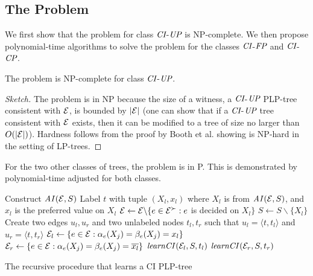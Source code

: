 \vspace{-0.1cm}
\subsection{The  Problem}

\vspace{-0.1cm}
We first show that the  problem for class $\textit{CI}$-$\textit{UP}$ is 
NP-complete. We then propose polynomial-time algorithms to solve the 
 problem
for the classes $\textit{CI}$-$\textit{FP}$ and $\textit{CI}$-$\textit{CP}$.

\begin{thm}
\label{thm:passlearn_CIUP}
	The  problem is NP-complete for class $\textit{CI}$-$\textit{UP}$.
\end{thm}
\begin{proof}[Sketch]
The problem is in NP because the size of a witness, 
a $\textit{CI}$-$\textit{UP}$ PLP-tree consistent with $\mathcal{E}$, is bounded by $|\mathcal{E}|$ (one
can show that if a $\textit{CI}$-$\textit{UP}$ tree consistent with $\mathcal{E}$ exists, then it can
be modified to a tree of size no larger than $O(|\mathcal{E}|)$).
	Hardness follows from the proof by Booth et al.  showing 
	 is NP-hard in the setting of LP-trees.
\end{proof}

For the two other classes of trees, the problem is in P. This is demonstrated 
by polynomial-time  adjusted for both classes.

\begin{algorithm}[ht]
	Construct $\mathit{AI}(\mathcal{E},S)$\;
	Label $t$ with tuple $(X_l,x_l)$ where $X_l$ is from $\mathit{AI}(\mathcal{E},S)$, 
		and $x_l$ is the preferred value on $X_l$\;
	$\mathcal{E} \leftarrow \mathcal{E} \backslash \{e \in \mathcal{E}^\succ: e$ is decided on $X_l\}$\;
	$S \leftarrow S \backslash \{X_l\}$\;
	Create two edges $u_l,u_r$ and two unlabeled nodes $t_l,t_r$ such that $u_l=\langle t,t_l\rangle$
		and $u_r=\langle t,t_r\rangle$\;
	$\mathcal{E}_l \leftarrow \{e\in \mathcal{E}: \alpha_e(X_j)=\beta_e(X_j)=x_l\}$\;
	$\mathcal{E}_r \leftarrow \{e\in \mathcal{E}: \alpha_e(X_j)=\beta_e(X_j)=\overline{x_l}\}$\;
	$\mathit{learnCI}(\mathcal{E}_l,S,t_l)$\;
	$\mathit{learnCI}(\mathcal{E}_r,S,t_r)$\;

\caption{The recursive procedure  that learns a CI PLP-tree \label{alg:recur_learnCI}}
\end{algorithm}

